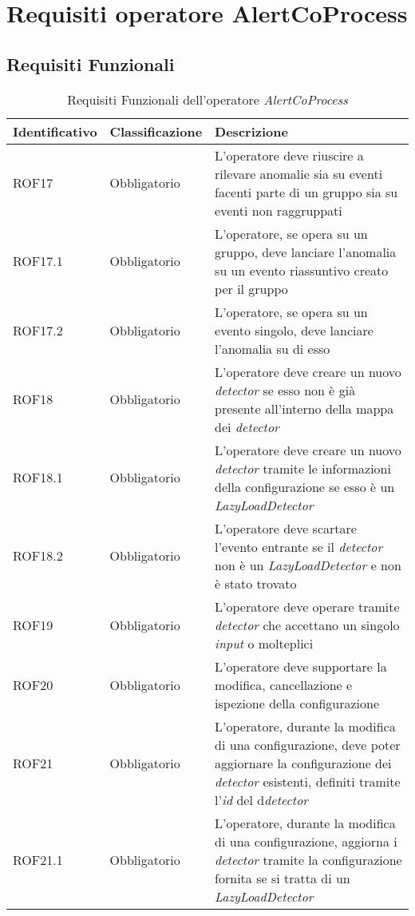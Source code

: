 \section{Requisiti operatore AlertCoProcess}
\subsection{Requisiti Funzionali}
{
\centering
\begin{longtable}{L{3cm} L{3cm} L{7.5cm}}
\caption{Requisiti Funzionali dell'operatore \textit{AlertCoProcess}}\\
\textbf{Identificativo} &
\textbf{Classificazione}&
\textbf{Descrizione}\\
\endhead
\hline
ROF17 & Obbligatorio & L'operatore deve riuscire a rilevare anomalie sia su eventi facenti parte di un gruppo sia su eventi non raggruppati\\
\hline
ROF17.1 & Obbligatorio & L'operatore, se opera su un gruppo, deve lanciare l'anomalia su un evento riassuntivo creato per il gruppo\\
\hline
ROF17.2 & Obbligatorio & L'operatore, se opera su un evento singolo, deve lanciare l'anomalia su di esso\\
\hline
ROF18 & Obbligatorio & L'operatore deve creare un nuovo \textit{detector} se esso non è già presente all'interno della mappa dei \textit{detector}\\
\hline
ROF18.1 & Obbligatorio & L'operatore deve creare un nuovo \textit{detector} tramite le informazioni della configurazione se esso è un \textit{LazyLoadDetector}\\
\hline
ROF18.2 & Obbligatorio & L'operatore deve scartare l'evento entrante se il \textit{detector} non è un \textit{LazyLoadDetector} e non è stato trovato\\
\hline
ROF19 & Obbligatorio & L'operatore deve operare tramite \textit{detector} che accettano un singolo \textit{input} o molteplici\\
\hline
ROF20 & Obbligatorio & L'operatore deve supportare la modifica, cancellazione e ispezione della configurazione\\
\hline
ROF21 & Obbligatorio & L'operatore, durante la modifica di una configurazione, deve poter aggiornare la configurazione dei \textit{detector} esistenti, definiti tramite l'\textit{id} del d\textit{detector}\\
\hline
ROF21.1 & Obbligatorio & L'operatore, durante la modifica di una configurazione, aggiorna i \textit{detector} tramite la configurazione fornita se si tratta di un \textit{LazyLoadDetector}\\

\end{longtable}}
